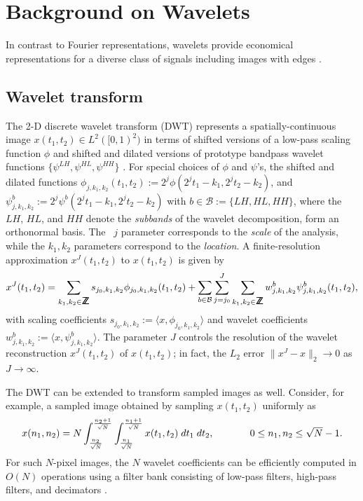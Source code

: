 \documentclass[11pt]{article}
\def\nnnx {n_1}
\def\nnny {n_2}
\def\nnkx {k_1}
\def\nnky {k_2}
\def\tttx {t_1}
\def\ttty {t_2}
\def\NORNSQ{\sqrt{N}}
\def\NtimesN{N}
\def\NSQ{N}
\newcommand{\nn} {\nonumber}
\def\integer {\hbox{\sf Z}\kern-0.430em \hbox{\sf Z}}  %
\begin{document}
\section{Background on Wavelets}
\label{wavelets}

In contrast to Fourier representations, wavelets provide economical
representations for a diverse class of signals including images with
edges \cite{DeVore3,mallat-new}.
\subsection{Wavelet transform}
\label{wavelettransform}
The 2-D discrete wavelet transform (DWT) represents a
spatially-continuous image $x(\tttx,\ttty) \in L^2([0,1)^{2})$ in terms of
shifted versions of a low-pass scaling function $\phi$ and
shifted and dilated versions of prototype bandpass wavelet functions
$\{\psi^{LH},\psi^{HL},\psi^{HH}\}$
\cite{mallat-new,burrus-wlet-intro}.  For special choices of $\phi$
and $\psi$'s, the shifted and dilated functions
$\phi_{j,\nnkx,\nnky}(\tttx,\ttty):=2^{j}\phi(2^{j}\tttx-\nnkx,2^{j}\ttty-\nnky)$,
and $\psi^{b}_{j,\nnkx,\nnky}:=2^{j}\psi^{b}(2^{j}\tttx-\nnkx,2^{j}\ttty-\nnky)$ with
$b\in{\mathcal{B}}:=\{LH,HL,HH\}$, where the $LH$, $HL$, and $HH$
denote the {\em subbands} of the wavelet decomposition, form an
orthonormal basis. The~ $j$ parameter corresponds to the {\em scale}
of the analysis, while the $\nnkx,\nnky$ parameters correspond to the {\em
location}.  A finite-resolution approximation $x^J(\tttx,\ttty)$ to $x(\tttx,\ttty)$ is given by
\begin{equation} 
x^J(\tttx,\ttty) = \sum_{\nnkx,\nnky\in\integer}
s_{j_0,\nnkx,\nnky}\phi_{j_{0},\nnkx,\nnky}(\tttx,\ttty) +
 \sum_{b\in\mathcal{B}}\sum_{j=j_0}^{J}\sum_{\nnkx,\nnky\in\integer}
w^{b}_{j,\nnkx,\nnky}\psi^{b}_{j,\nnkx,\nnky}(\tttx,\ttty), \nn
\label{wavelet_approx}
\end{equation}
with scaling coefficients $s_{j_0,\nnkx,\nnky} := \langle x,
\phi_{j_0,\nnkx,\nnky}\rangle$ and wavelet coefficients $w_{j,\nnkx,\nnky}^{b}
:= \langle x,\psi_{j,\nnkx,\nnky}^{b}\rangle$.  The parameter $J$ controls
the resolution of the wavelet reconstruction $x^J(\tttx,\ttty)$ of
$x(\tttx,\ttty)$; in fact, the $L_2$ error $\|x^J - x\|_2 \rightarrow 0$ as
$J \rightarrow \infty$.

The DWT can be extended to transform sampled images as well. Consider,
for example, a sampled image obtained by sampling $x(\tttx,\ttty)$
uniformly as
\begin{equation}
x(\nnnx,\nnny) = \NSQ  \int_{\frac{\nnny}{\NORNSQ}}^{\frac{\nnny+1}{\NORNSQ}}
\int_{\frac{\nnnx}{\NORNSQ}}^{\frac{\nnnx+1}{\NORNSQ}} x(\tttx,\ttty) \;d\tttx\;d\ttty,
~~~~~~~~~~~\mbox{$ 0\le \nnnx,\nnny \le \NORNSQ-1$}.
\label{samplingmodel}
\end{equation}
For such $\NtimesN$-pixel images, the $\NSQ $ wavelet coefficients
can be efficiently computed in $O(\NSQ )$ operations using a filter bank
consisting of low-pass filters, high-pass filters, and decimators
\cite{mallat-new}.
\end{document}
